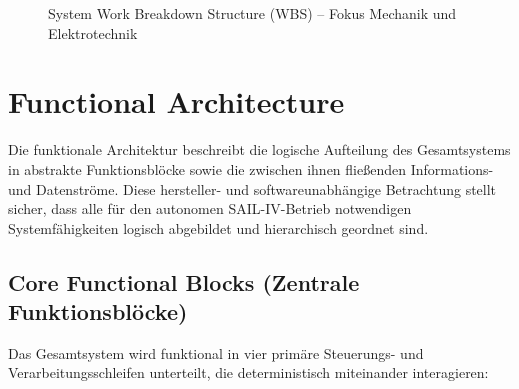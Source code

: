 \begin{figure}[!h]
\begin{tikzpicture}
\end{tikzpicture}
\caption{System Work Breakdown Structure (WBS) -- Fokus Mechanik und Elektrotechnik}
\label{fig:system_wbs}
\end{figure}

\section{Functional Architecture}
\label{sec:functional_architecture}

Die funktionale Architektur beschreibt die logische Aufteilung des Gesamtsystems in abstrakte Funktionsblöcke sowie die zwischen ihnen fließenden Informations- und Datenströme. 
Diese hersteller- und softwareunabhängige Betrachtung stellt sicher, dass alle für den autonomen SAIL-IV-Betrieb notwendigen Systemfähigkeiten logisch abgebildet und hierarchisch geordnet sind.

\subsection{Core Functional Blocks (Zentrale Funktionsblöcke)}
Das Gesamtsystem wird funktional in vier primäre Steuerungs- und Verarbeitungsschleifen unterteilt, die deterministisch miteinander interagieren:

